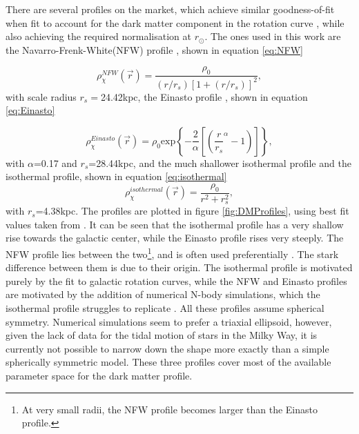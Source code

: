 There are several profiles on the market, which achieve similar goodness-of-fit when fit to account for the dark matter component in the rotation curve \cite{Ibarra:2012cc}, while also achieving the required normalisation at $r_\odot$. The ones used in this work are the Navarro-Frenk-White(NFW) profile \cite{Navarro_1996}, shown in equation \ref{eq:NFW}

\begin{equation}\label{eq:NFW}
    \rho_\chi^{NFW}(\vec{r}) = \frac{\rho_0}{(r/r_s)[1+(r/r_s)]^2},
\end{equation}
with scale radius $r_s=$24.42kpc, the Einasto profile \cite{Einasto}, shown in equation \ref{eq:Einasto}

\begin{equation}\label{eq:Einasto}
    \rho_\chi^{Einasto}(\vec{r}) = \rho_0 \mathrm{exp} \left\{ -\frac{2}{\alpha}\left[ \left( \frac{r}{r_s}^\alpha -1\right) \right] \right\},
\end{equation}
with $\alpha$=0.17 and $r_s$=28.44kpc, and the much shallower isothermal profile \cite{isothermal} and the isothermal profile, shown in equation \ref{eq:isothermal}
\begin{equation}\label{eq:isothermal}
    \rho_\chi^{isothermal}(\vec{r}) = \frac{\rho_0}{r^2+r_s^2},
\end{equation}
with $r_s$=4.38kpc. The profiles are plotted in figure \ref{fig:DMProfiles}, using best fit values taken from \cite{Ibarra:2012cc}. It can be seen that the isothermal profile has a very shallow rise towards the galactic center, while the Einasto profile rises very steeply. The NFW profile lies between the two\footnote{At very small radii, the NFW profile becomes larger than the Einasto profile.}, and is often used preferentially \cite{Korsmeier:2017xzj, Ibarra:2012cc, Coogan_2017}. The stark difference between them is due to their origin. The isothermal profile is motivated purely by the fit to galactic rotation curves, while the NFW and Einasto profiles are motivated by the addition of numerical N-body simulations, which the isothermal profile struggles to replicate \cite{Lin_2019}. All these profiles assume spherical symmetry. Numerical simulations seem to prefer a triaxial ellipsoid, however, given the lack of data for the tidal motion of stars in the Milky Way, it is currently not possible to narrow down the shape more exactly than a simple spherically symmetric model. These three profiles cover most of the available parameter space for the dark matter profile. \\

